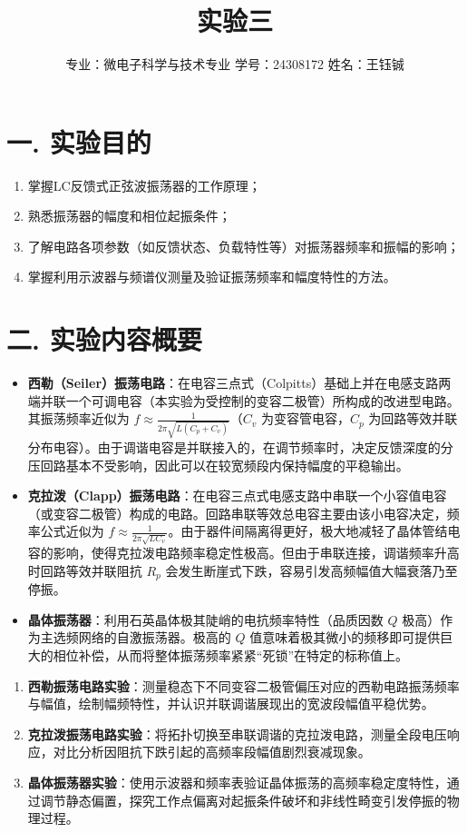\documentclass[12pt]{article}
\title{\Huge \textbf{实验三 \quad正弦波振荡器}}
\author{专业：微电子科学与技术专业 \quad 学号：24308172 \quad 姓名：王钰铖}
\date{}
\begin{document}
\maketitle

\section*{一. 实验目的}
\begin{enumerate}
    \item 掌握LC反馈式正弦波振荡器的工作原理；
    \item 熟悉振荡器的幅度和相位起振条件；
    \item 了解电路各项参数（如反馈状态、负载特性等）对振荡器频率和振幅的影响；
    \item 掌握利用示波器与频谱仪测量及验证振荡频率和幅度特性的方法。
\end{enumerate}

\section*{二. 实验内容概要}

\vspace{1em}
\begin{itemize}
    \item \textbf{西勒（Seiler）振荡电路}：在电容三点式（Colpitts）基础上并在电感支路两端并联一个可调电容（本实验为受控制的变容二极管）所构成的改进型电路。其振荡频率近似为 $f \approx \frac{1}{2\pi\sqrt{L (C_p + C_v)}}$（$C_v$ 为变容管电容，$C_p$ 为回路等效并联分布电容）。由于调谐电容是并联接入的，在调节频率时，决定反馈深度的分压回路基本不受影响，因此可以在较宽频段内保持幅度的平稳输出。
    \item \textbf{克拉泼（Clapp）振荡电路}：在电容三点式电感支路中串联一个小容值电容（或变容二极管）构成的电路。回路串联等效总电容主要由该小电容决定，频率公式近似为 $f \approx \frac{1}{2\pi\sqrt{L C_v}}$。由于器件间隔离得更好，极大地减轻了晶体管结电容的影响，使得克拉泼电路频率稳定性极高。但由于串联连接，调谐频率升高时回路等效并联阻抗 $R_p$ 会发生断崖式下跌，容易引发高频幅值大幅衰落乃至停振。
    \item \textbf{晶体振荡器}：利用石英晶体极其陡峭的电抗频率特性（品质因数 $Q$ 极高）作为主选频网络的自激振荡器。极高的 $Q$ 值意味着极其微小的频移即可提供巨大的相位补偿，从而将整体振荡频率紧紧“死锁”在特定的标称值上。
\end{itemize}

\vspace{1em}
\begin{enumerate}
    \item[(1)] \textbf{西勒振荡电路实验}：测量稳态下不同变容二极管偏压对应的西勒电路振荡频率与幅值，绘制幅频特性，并认识并联调谐展现出的宽波段幅值平稳优势。
    \item[(2)] \textbf{克拉泼振荡电路实验}：将拓扑切换至串联调谐的克拉泼电路，测量全段电压响应，对比分析因阻抗下跌引起的高频率段幅值剧烈衰减现象。
    \item[(3)] \textbf{晶体振荡器实验}：使用示波器和频率表验证晶体振荡的高频率稳定度特性，通过调节静态偏置，探究工作点偏离对起振条件破坏和非线性畸变引发停振的物理过程。
\end{enumerate}
\end{document}
